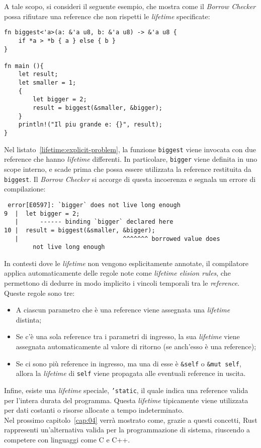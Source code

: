 A tale scopo, si consideri il seguente esempio, che mostra come il \textit{Borrow Checker} possa rifiutare una reference che non rispetti le \textit{lifetime} specificate:
\begin{lstlisting}[style=ruststyle, caption={Limitazioni delle \textit{lifetime}}, label={lifetime:explicit-problem}]
fn biggest<'a>(a: &'a u8, b: &'a u8) -> &'a u8 {
    if *a > *b { a } else { b }
}

fn main (){
    let result;
    let smaller = 1;
    {
        let bigger = 2;
        result = biggest(&smaller, &bigger);
    }
    println!("Il piu grande e: {}", result);
}
\end{lstlisting}
Nel listato~\ref{lifetime:explicit-problem}, la funzione \texttt{biggest} viene invocata con due reference che hanno \textit{lifetime} differenti. In particolare, \texttt{bigger} viene definita in uno scope interno, e scade prima che possa essere utilizzata la reference restituita da \texttt{biggest}. Il \textit{Borrow Checker} si accorge di questa incoerenza e segnala un errore di compilazione:
\begin{verbatim}
 error[E0597]: `bigger` does not live long enough
9  |  let bigger = 2;
   |      ------ binding `bigger` declared here
10 |  result = biggest(&smaller, &bigger);
   |                             ^^^^^^^ borrowed value does
        not live long enough 
\end{verbatim}
\vspace{5pt}
In contesti dove le \textit{lifetime} non vengono esplicitamente annotate, il compilatore applica automaticamente delle regole note come \textit{lifetime elision rules}, che permettono di dedurre in modo implicito i vincoli temporali tra le \textit{reference}. Queste regole sono tre:
\begin{itemize}
    \item A ciascun parametro che è una reference viene assegnata una \textit{lifetime} distinta;
    \item Se c'è una sola reference tra i parametri di ingresso, la sua \textit{lifetime} viene assegnata automaticamente al valore di ritorno (se anch'esso è una reference);
    \item Se ci sono più reference in ingresso, ma una di esse è \texttt{\&self} o \texttt{\&mut self}, allora la \textit{lifetime} di \texttt{self} viene propagata alle eventuali reference in uscita.
\end{itemize}
Infine, esiste una \textit{lifetime} speciale, \texttt{'static}, il quale indica una reference valida per l'intera durata del programma. Questa \textit{lifetime} tipicamente viene utilizzata per dati costanti o risorse allocate a tempo indeterminato.\hfill
\vspace{25pt}\\
\noindent Nel prossimo capitolo~\ref{cap:04} verrà mostrato come, grazie a questi concetti, Rust rappresenti un'alternativa valida
per la programmazione di sistema, riuscendo a competere con linguaggi come C e C++.